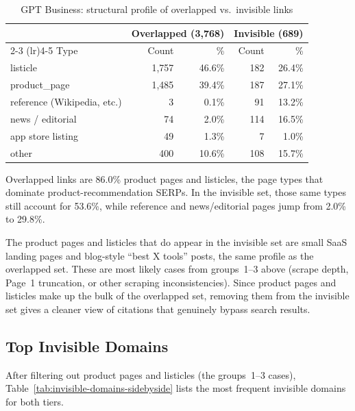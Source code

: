 \begin{table}[H]
\centering
\caption{GPT Business: structural profile of overlapped vs.\ invisible links}
\label{tab:invisible-type-breakdown}
\small
\begin{tabular}{lrrrr}
\toprule
 & \multicolumn{2}{c}{Overlapped (3{,}768)} & \multicolumn{2}{c}{Invisible (689)} \\
\cmidrule(lr){2-3} \cmidrule(lr){4-5}
Type & Count & \% & Count & \% \\
\midrule
listicle & 1{,}757 & 46.6\% & 182 & 26.4\% \\
product\_page & 1{,}485 & 39.4\% & 187 & 27.1\% \\
reference (Wikipedia, etc.) & 3 & 0.1\% & 91 & 13.2\% \\
news / editorial & 74 & 2.0\% & 114 & 16.5\% \\
app store listing & 49 & 1.3\% & 7 & 1.0\% \\
other & 400 & 10.6\% & 108 & 15.7\% \\
\bottomrule
\end{tabular}
\end{table}

\noindent Overlapped links are 86.0\% product pages and
listicles, the page types that dominate product-recommendation SERPs.
In the invisible set, those same types still account for 53.6\%, while
reference and news/editorial pages jump from 2.0\% to 29.8\%.

The product pages and listicles that do appear in the invisible set
are small SaaS landing pages and blog-style ``best X tools'' posts, the
same profile as the overlapped set. These are most likely cases from
groups~1--3 above (scrape depth, Page~1 truncation, or other
scraping inconsistencies). Since product pages and listicles make up
the bulk of the overlapped set, removing them from the invisible set
gives a cleaner view of citations that genuinely bypass search results.

\subsection{Top Invisible Domains}
\label{sec:top-invisible-domains}

After filtering out product pages and listicles (the groups~1--3
cases), Table~\ref{tab:invisible-domains-sidebyside} lists the most
frequent invisible domains for both tiers.


